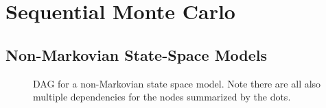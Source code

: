 
\section{Sequential Monte Carlo}
\label{sec:part:smc}

\subsection{Non-Markovian State-Space Models}
\label{sec:part:smc:nmssm}

\begin{figure}[t]
	\centering 
	
	\caption{DAG for a non-Markovian state space model.  Note there are all also multiple dependencies
		for the nodes summarized by the dots.
		\label{fig:part:nmssm}}
\end{figure}


